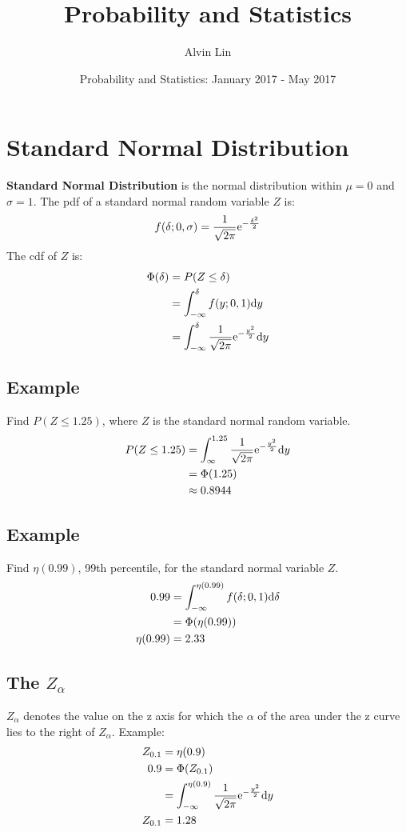 \documentclass{math}
\title{Probability and Statistics}
\author{Alvin Lin}
\date{Probability and Statistics: January 2017 - May 2017}
\begin{document}
\maketitle

\section*{Standard Normal Distribution}
\textbf{Standard Normal Distribution} is the normal distribution within
\( \mu = 0 \) and \( \sigma = 1 \). The pdf of a standard normal random
variable \( Z \) is:
\[ f(\delta;0,\sigma) = \frac{1}{\sqrt{2\pi}}\mathrm{e}^{-\frac{\delta^{2}}{2}} \]
The cdf of \( Z \) is:
\begin{align*}
  \Phi(\delta) &= P(Z\leq\delta) \\
  &= \int_{-\infty}^{\delta}f(y;0,1)\mathrm{d}{y} \\
  &= \int_{-\infty}^{\delta}\frac{1}{\sqrt{2\pi}}\mathrm{e}^{-\frac{y^{2}}{2}}\mathrm{d}{y}
\end{align*}

\subsection*{Example}
Find \( P(Z\leq 1.25) \), where \( Z \) is the standard normal random variable.
\begin{align*}
  P(Z\leq 1.25) &= \int_{\infty}^{1.25}\frac{1}{\sqrt{2\pi}}
    \mathrm{e}^{-\frac{y^{2}}{2}}\mathrm{d}{y} \\
  &= \Phi(1.25) \\
  &\approx 0.8944
\end{align*}

\subsection*{Example}
Find \( \eta(0.99) \), 99th percentile, for the standard normal variable
\( Z \).
\begin{align*}
  0.99 &= \int_{-\infty}^{\eta(0.99)}f(\delta;0,1)\mathrm{d}{\delta} \\
  &= \Phi(\eta(0.99)) \\
  \eta(0.99) &= 2.33 \\
\end{align*}

\subsection*{The \( Z_{\alpha} \)}
\( Z_{\alpha} \) denotes the value on the z axis for which the \( \alpha \) of
the area under the z curve lies to the right of \( Z_{\alpha} \). Example:
\begin{align*}
  Z_{0.1} &= \eta(0.9) \\
  0.9 &= \Phi(Z_{0.1}) \\
  &= \int_{-\infty}^{\eta(0.9)}\frac{1}{\sqrt{2\pi}}
    \mathrm{e}^{-\frac{y^{2}}{2}}\mathrm{d}{y} \\
  Z_{0.1} &= 1.28
\end{align*}
\end{document}
